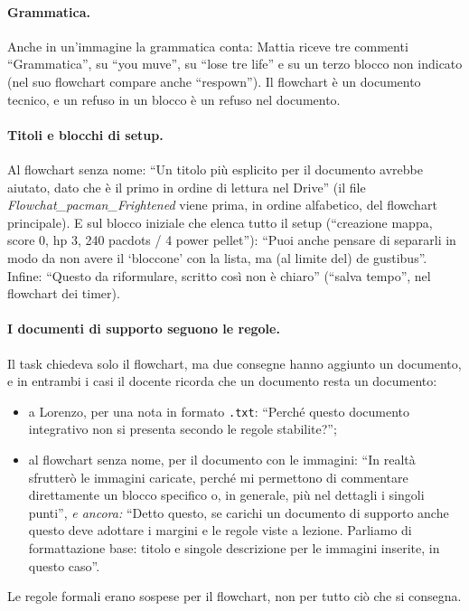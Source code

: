 \paragraph{Grammatica.} Anche in un'immagine la grammatica conta: Mattia riceve tre commenti
``Grammatica'', su ``you muve'', su ``lose tre life'' e su un terzo blocco non
indicato (nel suo flowchart compare anche ``respown'').
Il flowchart è un documento tecnico, e un refuso in un blocco è un refuso nel
documento.

\paragraph{Titoli e blocchi di setup.} Al flowchart senza nome: ``Un titolo
più esplicito per il documento avrebbe aiutato, dato che è il primo in ordine
di lettura nel Drive'' (il file \emph{Flowchat\_pacman\_Frightened} viene
prima, in ordine alfabetico, del flowchart principale). E sul blocco iniziale
che elenca tutto il setup (``creazione mappa, score 0, hp 3, 240 pacdots / 4
power pellet''): ``Puoi anche pensare di separarli in modo da non avere il
`bloccone' con la lista, ma (al limite del) de gustibus''. Infine:
``Questo da riformulare, scritto così non è chiaro'' (``salva tempo'', nel
flowchart dei timer).

\paragraph{I documenti di supporto seguono le regole.} Il task chiedeva solo
il flowchart, ma due consegne hanno aggiunto un documento, e in entrambi i
casi il docente ricorda che un documento resta un documento:
\begin{itemize}
  \item a Lorenzo, per una nota in formato \texttt{.txt}: ``Perché questo
        documento integrativo non si presenta secondo le regole stabilite?'';
  \item al flowchart senza nome, per il documento con le immagini: ``In realtà
        sfrutterò le immagini caricate, perché mi permettono di commentare
        direttamente un blocco specifico o, in generale, più nel dettagli i
        singoli punti'', \emph{e ancora:} ``Detto questo, se carichi un
        documento di supporto anche questo deve adottare i margini e le regole
        viste a lezione. Parliamo di formattazione base: titolo e singole
        descrizione per le immagini inserite, in questo caso''.
\end{itemize}
Le regole formali erano sospese per il flowchart, non per tutto ciò che si
consegna.


